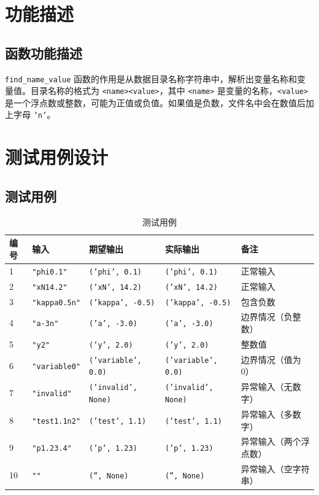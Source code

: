\documentclass{article}
\begin{document}
	\section*{功能描述}

\subsection*{函数功能描述}
\texttt{find\_name\_value} 函数的作用是从数据目录名称字符串中，解析出变量名称和变量值。目录名称的格式为 \texttt{<name><value>}，其中 \texttt{<name>} 是变量的名称，\texttt{<value>} 是一个浮点数或整数，可能为正值或负值。如果值是负数，文件名中会在数值后加上字母 \texttt{'n'}。

\section*{测试用例设计}

\subsection*{测试用例}

\begin{table}[htbp]
	\centering
	\begin{tabular}{@{}lllll@{}}
		\toprule
		\textbf{编号} & \textbf{输入} & \textbf{期望输出} & \textbf{实际输出} & \textbf{备注} \\
		\midrule
		1 & \texttt{"phi0.1"} & \texttt{('phi', 0.1)} & \texttt{('phi', 0.1)} & 正常输入 \\
		2 & \texttt{"xN14.2"} & \texttt{('xN', 14.2)} & \texttt{('xN', 14.2)} & 正常输入 \\
		3 & \texttt{"kappa0.5n"} & \texttt{('kappa', -0.5)} & \texttt{('kappa', -0.5)} & 包含负数 \\
		4 & \texttt{"a-3n"} & \texttt{('a', -3.0)} & \texttt{('a', -3.0)} & 边界情况（负整数） \\
		5 & \texttt{"y2"} & \texttt{('y', 2.0)} & \texttt{('y', 2.0)} & 整数值 \\
		6 & \texttt{"variable0"} & \texttt{('variable', 0.0)} & \texttt{('variable', 0.0)} & 边界情况（值为 0） \\
		7 & \texttt{"invalid"} & \texttt{('invalid', None)} & \texttt{('invalid', None)} & 异常输入（无数字） \\
		8 & \texttt{"test1.1n2"} & \texttt{('test', 1.1)} & \texttt{('test', 1.1)} & 异常输入（多数字） \\
		9 & \texttt{"p1.23.4"} & \texttt{('p', 1.23)} & \texttt{('p', 1.23)} & 异常输入（两个浮点数） \\
		10 & \texttt{""} & \texttt{('', None)} & \texttt{('', None)} & 异常输入（空字符串） \\
		\bottomrule
	\end{tabular}
	\caption{测试用例}
\end{table}
\end{document}
